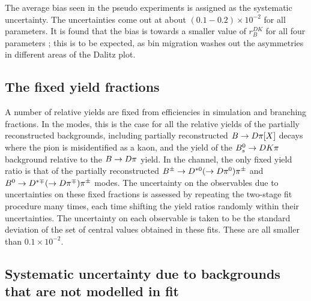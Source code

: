 The average bias seen in the pseudo experiments is assigned as the systematic uncertainty. The uncertainties come out at about $(0.1-0.2)\times 10^{-2}$ for all parameters. It is found that the bias is towards a smaller value of $r_B^{DK}$ for all four \DK parameters ; this is to be expected, as bin migration washes out the asymmetries in different areas of the Dalitz plot. 





\subsection{The fixed yield fractions} %
\label{sub:the_bs_yield}

A number of relative yields are fixed from efficiencies in simulation and branching fractions. In the \DK modes, this is the case for all the relative yields of the partially reconstructed backgrounds, including partially reconstructed ${B}\rightarrow{\ensuremath{D}}\pi[X]$ decays where the pion is misidentified as a kaon, and the yield of the ${{B}^0_{s}}\rightarrow{\ensuremath{D}}{\ensuremath{K}}\pi$ background relative to the ${B}\rightarrow{\ensuremath{D}}\pi$ yield. In the \BtoDpi channel, the only fixed yield ratio is that of the partially reconstructed ${{B}^\pm}\rightarrow{\ensuremath{{D}^{*0}}}(\rightarrow{\ensuremath{D}}{\ensuremath{{\pi}^0}}){{\pi}^\pm}$ and ${{B}^0}\rightarrow{\ensuremath{{D}^{*\mp}}}(\rightarrow{\ensuremath{D}}{\ensuremath{{\pi}^\mp}}){{\pi}^\pm}$ modes. The uncertainty on the observables due to uncertainties on these fixed fractions is assessed by repeating the two-stage fit procedure many times, each time shifting the yield ratios randomly within their uncertainties. The uncertainty on each observable is taken to be the standard deviation of the set of central values obtained in these fits. These are all smaller than $0.1\times 10^{-2}$.


\subsection{Systematic uncertainty due to backgrounds that are not modelled in fit} %
\label{sub:systematic_uncertainty_due_to_backgrounds_that_are_not_modelled_in_fit}

